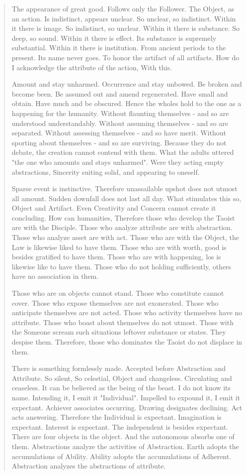 \documentclass[12pt,a4paper,oneside]{book}
\begin{document}
\begin{verse}
The appearance of great good. Follows only the Follower. The Object, as an action. Is indistinct, appears unclear. So unclear, so indistinct. Within it there is image. So indistinct, so unclear. Within it there is substance. So deep, so sound. Within it there is effect. Its substance is supremely substantial. Within it there is institution. From ancient periods to the present. Its name never goes. To honor the artifact of all artifacts. How do I acknowledge the attribute of the action, With this.

Amount and stay unharmed. Occurrence and stay unbowed. Be broken and become been. Be assumed out and amend regenerated. Have small and obtain. Have much and be obscured. Hence the wholes hold to the one as a happening for the humanity. Without flaunting themselves - and so are understood understandably. Without assuming themselves - and so are separated. Without assessing themselves - and so have merit. Without sporting about themselves - and so are surviving. Because they do not debate, the creation cannot contend with them. What the adults uttered "the one who amounts and stays unharmed". Were they acting empty abstractions, Sincerity suiting solid, and appearing to oneself.

Sparse event is instinctive. Therefore unassailable upshot does not utmost all amount. Sudden downfall does not last all day. What stimulates this so, Object and Artifact. Even Creativity and Concern cannot create it concluding. How can humanities, Therefore those who develop the Taoist are with the Disciple. Those who analyze attribute are with abstraction. Those who analyze asset are with act. Those who are with the Object, the Law is likewise liked to have them. Those who are with worth, good is besides gratified to have them. Those who are with happening, los is likewise like to have them. Those who do not holding sufficiently, others have no association in them.

Those who are on objects cannot stand. Those who constitute cannot cover. Those who expose themselves are not exonerated. Those who anticipate themselves are not acted. Those who activity themselves have no attribute. Those who boast about themselves do not utmost. Those with the Someone scream such situations leftover substance or states. They despise them. Therefore, those who dominates the Taoist do not displace in them.

There is something formlessly made. Accepted before Abstraction and Attribute. So silent, So celestial, Object and changeless. Circulating and ceaseless. It can be believed as the being of the beast. I do not know its name. Intending it, I emit it "Individual". Impelled to expound it, I emit it expectant. Achiever associates occurring. Drawing designates declining. Act acts answering. Therefore the Individual is expectant. Imagination is expectant. Interest is expectant. The independent is besides expectant. There are four objects in the object. And the autonomous absorbs one of them. Abstractions analyze the activities of Abstraction. Earth adopts the accumulations of Ability. Ability adopts the accumulations of Adherent. Abstraction analyzes the abstractions of attribute.


\end{verse}
\end{document}
